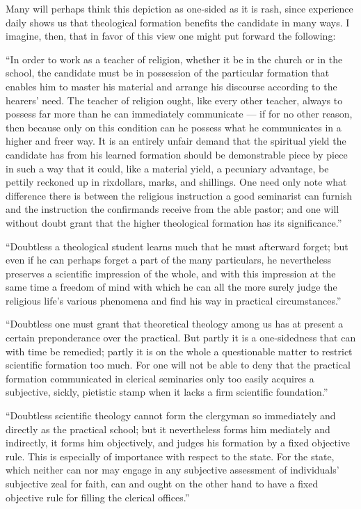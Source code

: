 \documentclass[12pt,a4paper]{book}
\begin{document}
Many will perhaps think this depiction as one-sided as it is rash, since experience daily shows us
that theological formation benefits the candidate in many ways. I imagine, then, that in favor of
this view one might put forward the following:

``In order to work as a teacher of religion, whether it be in the church or in the school, the
candidate must be in possession of the particular formation that enables him to master his material
and arrange his discourse according to the hearers' need. The teacher of religion ought, like every
other teacher, always to possess far more than he can immediately communicate --- if for no other
reason, then because only on this condition can he possess what he communicates in a higher and
freer way. It is an entirely unfair demand that the spiritual yield the candidate has from his
learned formation should be demonstrable piece by piece in such a way that it could, like a material
yield, a pecuniary advantage, be pettily reckoned up in rixdollars, marks, and shillings. One need
only note what difference there is between the religious instruction a good seminarist can furnish
and the instruction the confirmands receive from the able pastor; and one will without doubt grant
that the higher theological formation has its significance.''

``Doubtless a theological student learns much that he must afterward forget; but even if he can
perhaps forget a part of the many particulars, he nevertheless preserves a scientific impression of
the whole, and with this impression at the same time a freedom of mind with which he can all the
more surely judge the religious
life's various phenomena and find his way in practical circumstances.''

``Doubtless one must grant that theoretical theology among us has at present a certain preponderance
over the practical. But partly it is a one-sidedness that can with time be remedied; partly it is on
the whole a questionable matter to restrict scientific formation too much. For one will not be able
to deny that the practical formation communicated in clerical seminaries only too easily acquires a
subjective, sickly, pietistic stamp when it lacks a firm scientific foundation.''

``Doubtless scientific theology cannot form the clergyman so immediately and directly as the
practical school; but it nevertheless forms him mediately and indirectly, it forms him objectively,
and judges his formation by a fixed objective rule. This is especially of importance with respect to
the state. For the state, which neither can nor may engage in any subjective assessment of
individuals' subjective zeal for faith, can and ought on the other hand to have a fixed objective
rule for filling the clerical offices.''
\end{document}
